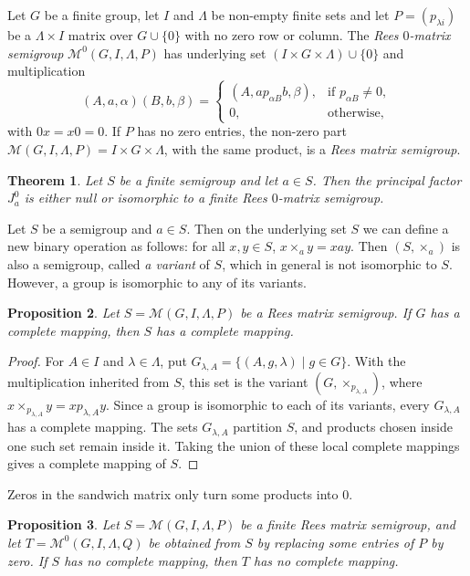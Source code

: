 \documentclass[11pt]{article}
\theoremstyle{plain}
\newtheorem{theorem}{Theorem}[section]
\newtheorem{prop}[theorem]{Proposition}
\theoremstyle{remark}
\theoremstyle{definition}
\theoremstyle{plain}
\begin{document}
\begingroup
Let $G$ be a finite group, let $I$ and $\Lambda$ be non-empty finite sets and
let $P=(p_{\lambda i})$ be a $\Lambda\times I$ matrix over $G\cup\{0\}$
with no zero row or column. The \emph{Rees $0$-matrix semigroup}
$\mathcal M^0(G,I,\Lambda,P)$ has underlying set
$(I\times G\times\Lambda)\cup\{0\}$ and multiplication
\[
(A,a,\alpha)(B,b,\beta)=
\begin{cases}
(A,ap_{\alpha B}b,\beta),&\text{if }p_{\alpha B}\ne0,\\
0,&\text{otherwise,}
\end{cases}
\]
with $0x=x0=0$. If $P$ has no zero entries, the non-zero part
$\mathcal M(G,I,\Lambda,P)=I\times G\times\Lambda$, with the same product,
is a \emph{Rees matrix semigroup}.

\begin{theorem}\label{t:principal-factor-Rees}
Let $S$ be a finite semigroup and let $a\in S$. Then the principal factor
$J_a^0$ is either null or isomorphic to a finite Rees $0$-matrix semigroup.
\end{theorem}
\endgroup

Let $S$ be a semigroup and $a\in S$. Then on the underlying set $S$ we can define a new binary operation as follows: for all $x,y\in S$,
\(x \times_a y = xay.\)
Then $(S,\times_a)$ is also a semigroup, called \emph{a variant} of $S$, which in general is not isomorphic to $S$. However, a group is isomorphic to any of its variants.

\begin{prop}\label{p:gp2rees}
Let $S=\mathcal M(G,I,\Lambda,P)$ be a Rees matrix semigroup. If $G$ has a complete mapping, then $S$ has a complete mapping.
\end{prop}

\begin{proof}
For $A\in I$ and $\lambda\in\Lambda$, put
\(G_{\lambda,A}=\{(A,g,\lambda)\mid g\in G\}.\)
With the multiplication inherited from $S$, this set is the variant $(G,\times_{p_{\lambda,A}})$, where $x\times_{p_{\lambda,A}}y=xp_{\lambda,A}y$. Since a group is isomorphic to each of its variants, every $G_{\lambda,A}$ has a complete mapping. The sets $G_{\lambda,A}$ partition $S$, and products chosen inside one such set remain inside it. Taking the union of these local complete mappings gives a complete mapping of $S$.
\end{proof}

Zeros in the sandwich matrix only turn some products into $0$.

\begin{prop}\label{p:adding0}
Let $S=\mathcal M(G,I,\Lambda,P)$ be a finite Rees matrix semigroup, and let $T=\mathcal M^0(G,I,\Lambda,Q)$ be obtained from $S$ by replacing some entries of $P$ by zero. If $S$ has no complete mapping, then $T$ has no complete mapping.
\end{prop}
\end{document}
